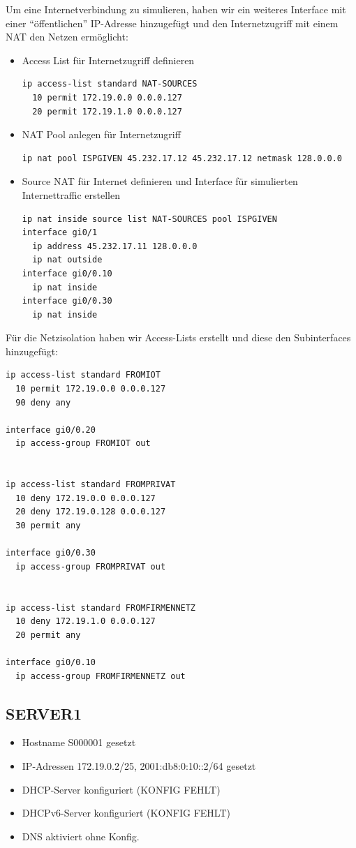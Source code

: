 \documentclass[11pt]{article}
\begin{document}
Um eine Internetverbindung zu simulieren, haben wir ein weiteres Interface mit einer ``öffentlichen'' IP-Adresse hinzugefügt und den Internetzugriff mit einem NAT den Netzen ermöglicht:

\begin{itemize}
\item Access List für Internetzugriff definieren
\begin{verbatim}
ip access-list standard NAT-SOURCES
  10 permit 172.19.0.0 0.0.0.127
  20 permit 172.19.1.0 0.0.0.127
\end{verbatim}
\item NAT Pool anlegen für Internetzugriff
\begin{verbatim}
ip nat pool ISPGIVEN 45.232.17.12 45.232.17.12 netmask 128.0.0.0
\end{verbatim}
\item Source NAT für Internet definieren und Interface für simulierten Internettraffic erstellen
\begin{verbatim}
ip nat inside source list NAT-SOURCES pool ISPGIVEN
interface gi0/1
  ip address 45.232.17.11 128.0.0.0
  ip nat outside
interface gi0/0.10
  ip nat inside
interface gi0/0.30
  ip nat inside
\end{verbatim}
\end{itemize}

Für die Netzisolation haben wir Access-Lists erstellt und diese den Subinterfaces hinzugefügt:

\begin{verbatim}
ip access-list standard FROMIOT
  10 permit 172.19.0.0 0.0.0.127
  90 deny any

interface gi0/0.20
  ip access-group FROMIOT out


ip access-list standard FROMPRIVAT
  10 deny 172.19.0.0 0.0.0.127
  20 deny 172.19.0.128 0.0.0.127
  30 permit any

interface gi0/0.30
  ip access-group FROMPRIVAT out


ip access-list standard FROMFIRMENNETZ
  10 deny 172.19.1.0 0.0.0.127
  20 permit any

interface gi0/0.10
  ip access-group FROMFIRMENNETZ out
\end{verbatim}
\subsection{SERVER1}
\label{sec:org7e7a06b}
\begin{itemize}
\item Hostname S000001 gesetzt
\item IP-Adressen 172.19.0.2/25, 2001:db8:0:10::2/64 gesetzt
\item DHCP-Server konfiguriert (KONFIG FEHLT)
\item DHCPv6-Server konfiguriert (KONFIG FEHLT)
\item DNS aktiviert ohne Konfig.
\end{itemize}
\end{document}
